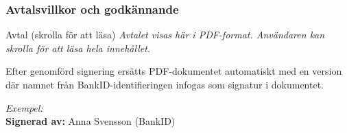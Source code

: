 \documentclass[10pt]{beamer}
\begin{document}
\begin{frame}[fragile]
  \frametitle{Avtalsvillkor och godkännande}

  \begin{block}{Avtal (skrolla för att läsa)}
    \vspace{0.2cm}
    \textit{\footnotesize Avtalet visas här i PDF-format. Användaren kan skrolla för att läsa hela innehållet.}
    \vspace{0.4cm}
  \end{block}

  \vspace{0.4cm}
  \begin{center}
  \end{center}

  \vspace{0.6cm}
  \small
  Efter genomförd signering ersätts PDF-dokumentet automatiskt med en version där
  namnet från BankID-identifieringen infogas som signatur i dokumentet.
  \medskip

  \textit{Exempel:}\\
  \textbf{Signerad av:} Anna Svensson (BankID)

\end{frame}
\end{document}
